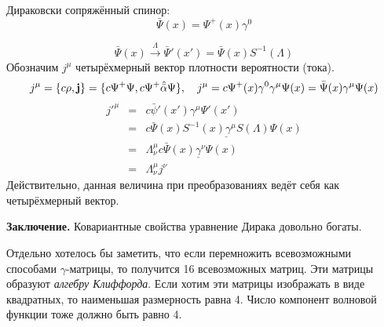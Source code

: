 Дираковски сопряжённый спинор:
$$
    \bar \Psi(x) = \Psi^{+} (x) \gamma^0
$$

$$
    \bar\Psi(x) \overset{\Lambda}\to \bar\Psi'(x') = \bar \Psi(x) S^{-1}(\Lambda)
$$
Обозначим $j^\mu$ четырёхмерный вектор плотности вероятности (тока).
$$
    j^\mu = \{
        c \rho, \bf j
    \} = \{
        c \Psi^+ \Psi, c \Psi^+ \hat{\bar \alpha} \Psi
    \}, \quad j^\mu = c \Psi^+(x) \gamma^0 \gamma^\mu \Psi(x) =  \bar \Psi(x) \gamma^\mu \Psi(x)
$$
\begin{eqnarray*}
    j'^{\mu} &=& c \bar \psi'(x') \gamma^\mu \Psi'(x')\\
    &=& c \bar \Psi(x) \underline{S^{-1}(x) \gamma^\mu S(\Lambda)} \Psi(x)\\
    &=& \Lambda^{\mu}_{\nu} \underline{c \bar \Psi(x) \gamma^{\nu} \Psi(x)}\\
    &=& \Lambda^{\mu}_{\nu} j^{\nu}
\end{eqnarray*}
Действительно, данная величина при преобразованиях ведёт себя как четырёхмерный вектор.

\textbf{Заключение.} Ковариантные свойства уравнение Дирака довольно богаты.

Отдельно хотелось бы заметить, что если перемножить всевозможными способами $\gamma$-матрицы, то получится 16 всевозможных матриц. Эти матрицы образуют \emph{алгебру Клиффорда}. Если хотим эти матрицы изображать в виде квадратных,  то наименьшая размерность равна 4. Число компонент волновой функции тоже должно быть равно 4.